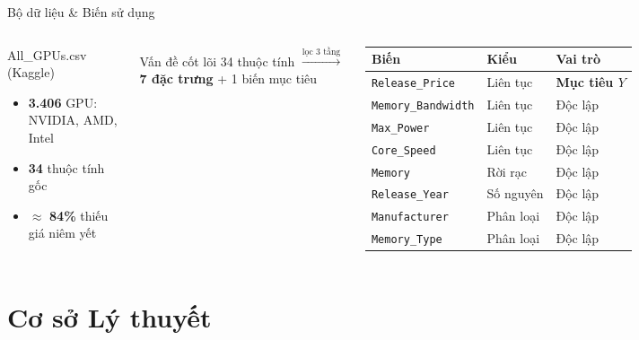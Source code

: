 \documentclass[13pt, aspectratio=169]{beamer}
\newcommand{\hl}[1]{\textcolor{red!75!black}{\textbf{#1}}}
\begin{document}
\begin{frame}{Bộ dữ liệu \& Biến sử dụng}
  \begin{columns}[T]
      \begin{block}{All\_GPUs.csv (Kaggle)}
        \footnotesize
        \begin{itemize}
          \item \textbf{3.406} GPU: NVIDIA, AMD, Intel
          \item \textbf{34} thuộc tính gốc
          \item \(\approx\) \hl{84\%} thiếu giá niêm yết
        \end{itemize}
      \end{block}
      \vspace{0.4em}
      \begin{alertblock}{Vấn đề cốt lõi}
        \footnotesize 34 thuộc tính $\xrightarrow{\text{lọc 3 tầng}}$ \hl{7 đặc trưng} + 1 biến mục tiêu
      \end{alertblock}
      \centering
      \small
      \renewcommand{\arraystretch}{1.15}
      \begin{tabular}{lll}
        \toprule
        \textbf{Biến} & \textbf{Kiểu} & \textbf{Vai trò} \\
        \midrule
        \texttt{Release\_Price} & Liên tục & \hl{Mục tiêu $Y$} \\
        \texttt{Memory\_Bandwidth} & Liên tục & Độc lập \\
        \texttt{Max\_Power} & Liên tục & Độc lập \\
        \texttt{Core\_Speed} & Liên tục & Độc lập \\
        \texttt{Memory} & Rời rạc & Độc lập \\
        \texttt{Release\_Year} & Số nguyên & Độc lập \\
        \texttt{Manufacturer} & Phân loại & Độc lập \\
        \texttt{Memory\_Type} & Phân loại & Độc lập \\
        \bottomrule
      \end{tabular}
  \end{columns}
\end{frame}

\section{Cơ sở Lý thuyết}
\end{document}
